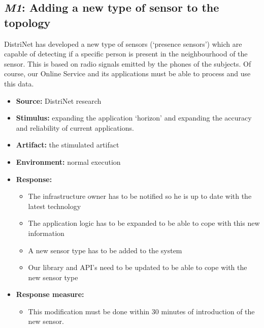 \subsection{\emph{M1}: Adding a new type of sensor to the topology}
DistriNet has developed a new type of sensors (`presence sensors') which are capable of detecting if a specific person is present in the neighbourhood  of the sensor. This is based on radio signals emitted by the phones of the subjects. Of course, our Online Service and its applications must be able to process and use this data.
\begin{itemize}
    \item \textbf{Source:} DistriNet research
    \item \textbf{Stimulus:} expanding the application `horizon' and expanding the accuracy and reliability of current applications.
    \item \textbf{Artifact:} the stimulated artifact
    \item \textbf{Environment:} normal execution
    \item \textbf{Response:}
        \begin{itemize}
        	\item The infrastructure owner has to be notified so he is up to date with the latest technology
            \item The application logic has to be expanded to be able to cope with this new information
            \item A new sensor type has to be added to the system
            \item Our library and API's need to be updated to be able to cope with the new sensor type
        \end{itemize}

    \item \textbf{Response measure:}
        \begin{itemize}
            \item This modification must be done within 30 minutes of introduction of the new sensor.
        \end{itemize}
\end{itemize}


